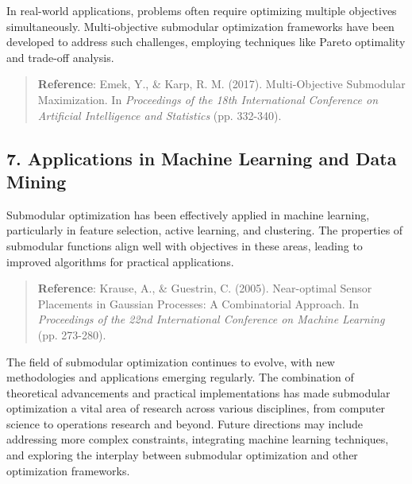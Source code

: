 In real-world applications, problems often require optimizing multiple objectives simultaneously. Multi-objective submodular optimization frameworks have been developed to address such challenges, employing techniques like Pareto optimality and trade-off analysis.

\begin{quote}
	\textbf{Reference}: Emek, Y., \& Karp, R. M. (2017). Multi-Objective Submodular Maximization. In \textit{Proceedings of the 18th International Conference on Artificial Intelligence and Statistics} (pp. 332-340).
\end{quote}

\subsection*{7. Applications in Machine Learning and Data Mining}

Submodular optimization has been effectively applied in machine learning, particularly in feature selection, active learning, and clustering. The properties of submodular functions align well with objectives in these areas, leading to improved algorithms for practical applications.

\begin{quote}
	\textbf{Reference}: Krause, A., \& Guestrin, C. (2005). Near-optimal Sensor Placements in Gaussian Processes: A Combinatorial Approach. In \textit{Proceedings of the 22nd International Conference on Machine Learning} (pp. 273-280).
\end{quote}

The field of submodular optimization continues to evolve, with new methodologies and applications emerging regularly. The combination of theoretical advancements and practical implementations has made submodular optimization a vital area of research across various disciplines, from computer science to operations research and beyond. Future directions may include addressing more complex constraints, integrating machine learning techniques, and exploring the interplay between submodular optimization and other optimization frameworks.
